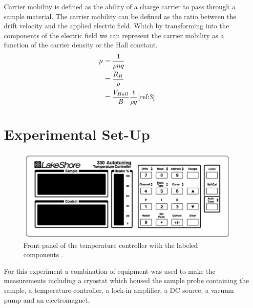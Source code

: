 \documentclass[twocolumn]{article}
\begin{document}
Carrier mobility is defined as the ability of a charge carrier to pass through 
a sample material. The carrier mobility can be defined as the ratio between the 
drift velocity and the applied electric field. Which by transforming into the 
components of the electric field we can represent the carrier mobility as a 
function of the carrier density or the Hall constant.
\begin{equation}
\begin{align*}
\mu &= \frac{1}{\rho nq} \\
    &= \frac{R_H}{\rho} \\
    &= \frac{V_{Hall}}{B}\frac{t}{\rho q}
\cite{ref:3}
\label{eqn:16}
\end{align*}
\end{equation}
\section{Experimental Set-Up}
\begin{figure}
\includegraphics[width=\textwidth]{temperature-cont.png}
\caption{Front panel of the temperature controller with the labeled components
\cite{ref:3}.}
\label{fig:6}
\end{figure}
For this experiment a combination of equipment was used to make the 
measurements including a cryostat which housed the sample probe containing the 
sample, a temperature controller, a lock-in amplifier, a DC source, a vacuum 
pump and an electromagnet.
\end{document}
